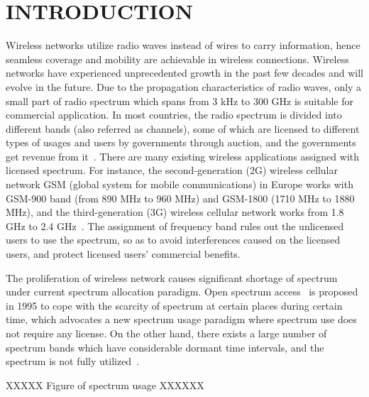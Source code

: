 \chapter{INTRODUCTION}
Wireless networks utilize radio waves instead of wires to carry information, hence seamless coverage and mobility are achievable in wireless connections.
Wireless networks have experienced unprecedented growth in the past few decades and will evolve in the future.
Due to the propagation characteristics of radio waves, only a small part of radio spectrum which spans from 3 kHz to 300 GHz
is suitable for commercial application.
In most countries, the radio spectrum is divided into different bands (also referred as channels), some of which are licensed to different types of usages and users by governments through auction, and the governments get revenue from it~\cite{Spectrum_Management07}.
There are many existing wireless applications assigned with licensed spectrum.
For instance, the second-generation (2G) wireless cellular network GSM (global system for mobile communications) in Europe works with GSM-900 band (from 890 MHz to 960 MHz) and GSM-1800 (1710 MHz to 1880 MHz), and the third-generation (3G) wireless cellular network works from 1.8 GHz to 2.4 GHz~\cite{wireless_communicatioins2001}.
The assignment of frequency band rules out the unlicensed users to use the spectrum, so as to avoid interferences caused on the licensed users, and protect licensed users' commercial benefits.

The proliferation of wireless network causes significant shortage of spectrum under current spectrum allocation paradigm.
Open spectrum access~\cite{osa_Noam_1995} is proposed in 1995 to cope with the scarcity of spectrum at certain places during certain time, which advocates a new spectrum usage paradigm where spectrum use does not require any license.
On the other hand, there exists a large number of spectrum bands which have considerable dormant time intervals, and the spectrum is not fully utilized~\cite{Akyildiz06survey}.


XXXXX Figure of spectrum usage XXXXXX


